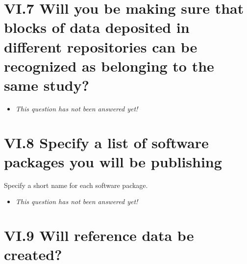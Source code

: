 \documentclass[a4paper,12pt]{report}
\begin{document}
\section*{\protect\textcolor{colorSecId}{VI.7} Will you be making sure that blocks of data deposited in different repositories can be recognized as belonging to the same study?}

\label{d5b27482-b598-4b8c-b534-417d4ad27394.92a10652-3675-48f2-8d50-180a29cec62e}






\begin{itemize}
  \item[\XSolidBrush] \textit{This question has not been answered yet!}
\end{itemize}
  


\section*{\protect\textcolor{colorSecId}{VI.8} Specify a list of software packages you will be publishing}

\label{d5b27482-b598-4b8c-b534-417d4ad27394.1ae8d7b0-4bcd-4914-aaea-fa389fc056f4}




\noindent
\begin{markdown}
Specify a short name for each software package.
\end{markdown}



\begin{itemize}
  \item[\XSolidBrush] \textit{This question has not been answered yet!}
\end{itemize}
  


\section*{\protect\textcolor{colorSecId}{VI.9} Will reference data be created?}

\label{d5b27482-b598-4b8c-b534-417d4ad27394.588ad032-56ba-4d52-b29c-6a5b56aa6569}
\end{document}
